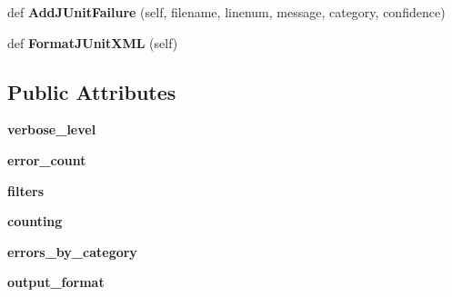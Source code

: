 \begin{DoxyCompactItemize}
\item 
def {\bfseries Add\+J\+Unit\+Failure} (self, filename, linenum, message, category, confidence)\hypertarget{classcpplint_1_1__CppLintState_a82f8ae70ccd4fd1866bfc489c489dc13}{}\label{classcpplint_1_1__CppLintState_a82f8ae70ccd4fd1866bfc489c489dc13}

\item 
def {\bfseries Format\+J\+Unit\+X\+ML} (self)\hypertarget{classcpplint_1_1__CppLintState_a7a2f9c080fba9804028d1366bf338a06}{}\label{classcpplint_1_1__CppLintState_a7a2f9c080fba9804028d1366bf338a06}

\end{DoxyCompactItemize}
\subsection*{Public Attributes}
\begin{DoxyCompactItemize}
\item 
{\bfseries verbose\+\_\+level}\hypertarget{classcpplint_1_1__CppLintState_a94328754c2f7481f4da9757a9dede308}{}\label{classcpplint_1_1__CppLintState_a94328754c2f7481f4da9757a9dede308}

\item 
{\bfseries error\+\_\+count}\hypertarget{classcpplint_1_1__CppLintState_a4039ff9668057eff4549b99905ce753b}{}\label{classcpplint_1_1__CppLintState_a4039ff9668057eff4549b99905ce753b}

\item 
{\bfseries filters}\hypertarget{classcpplint_1_1__CppLintState_a8443105b9623383ab75fa242009c006e}{}\label{classcpplint_1_1__CppLintState_a8443105b9623383ab75fa242009c006e}

\item 
{\bfseries counting}\hypertarget{classcpplint_1_1__CppLintState_acd4f4157637d141a4de63bf10d2ca755}{}\label{classcpplint_1_1__CppLintState_acd4f4157637d141a4de63bf10d2ca755}

\item 
{\bfseries errors\+\_\+by\+\_\+category}\hypertarget{classcpplint_1_1__CppLintState_afb33527113706b5fcae07d680d8cec99}{}\label{classcpplint_1_1__CppLintState_afb33527113706b5fcae07d680d8cec99}

\item 
{\bfseries output\+\_\+format}\hypertarget{classcpplint_1_1__CppLintState_a5c68ca79b0ff9b2fba1c488a7b2bd3f0}{}\label{classcpplint_1_1__CppLintState_a5c68ca79b0ff9b2fba1c488a7b2bd3f0}

\end{DoxyCompactItemize}


